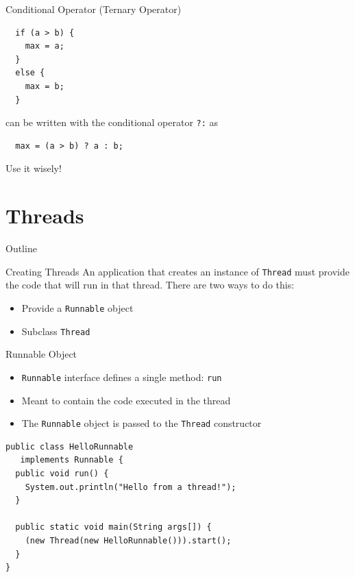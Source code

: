 \begin{frame}[fragile]{Conditional Operator (Ternary Operator)}
  \begin{lstlisting}
  if (a > b) {
    max = a;
  }
  else {
    max = b;
  }    
  \end{lstlisting}


  can be written with the conditional operator \lstinline!?:! as


  \begin{lstlisting}
  max = (a > b) ? a : b;
  \end{lstlisting}


  Use it wisely!
\end{frame}


\section{Threads}

\begin{frame}{Outline}
  \tableofcontents[current]
\end{frame}

\begin{frame}{Creating Threads}
  An application that creates an instance of \lstinline!Thread! must
  provide the code that will run in that thread. There are two ways to
  do this:


  \begin{itemize}
  \item Provide a \lstinline!Runnable! object
  \item Subclass \lstinline!Thread!
  \end{itemize}
\end{frame}

\begin{frame}[fragile]{Runnable Object}
  \begin{itemize}
  \item \lstinline!Runnable! interface defines a single method:
    \lstinline!run!
  \item Meant to contain the code executed in the thread
  \item The \lstinline!Runnable! object is passed to the
    \lstinline!Thread! constructor
  \end{itemize}


  \begin{lstlisting}
public class HelloRunnable 
   implements Runnable {
  public void run() {
    System.out.println("Hello from a thread!");
  }
  
  public static void main(String args[]) {
    (new Thread(new HelloRunnable())).start();
  }
}
  \end{lstlisting}
\end{frame}

